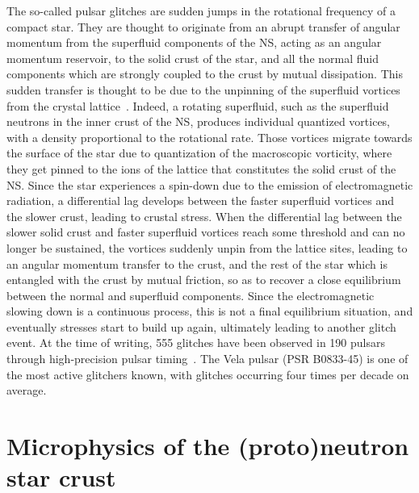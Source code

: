 The so-called pulsar glitches are sudden jumps in the rotational frequency of 
a compact star. They are thought to originate from an abrupt transfer of 
angular momentum from the superfluid components of the NS, acting as an angular 
momentum reservoir, to the solid crust of the star, and all the normal fluid
components which are strongly coupled to the crust by mutual dissipation. This
sudden transfer is thought to be due to the unpinning of the superfluid 
vortices from the crystal lattice~\cite{Anderson1975}. 
%
Indeed, a rotating superfluid, such as the superfluid neutrons in the inner 
crust of the NS, produces individual quantized vortices, with a density 
proportional to the rotational rate. Those vortices migrate towards the surface 
of the star due to {quantization of the macroscopic vorticity}, where 
they get pinned to the ions of the lattice that constitutes the solid 
crust of the NS. Since the star experiences a spin-down due to the emission of 
electromagnetic radiation, a differential lag develops between the faster 
superfluid vortices and the slower crust, leading to crustal stress. 
%
When the differential lag between the slower solid crust and faster superfluid 
vortices reach some threshold and can no longer be sustained, the vortices
suddenly unpin from the lattice sites, leading to an angular momentum transfer
to the crust, and the rest of the star which is entangled with the crust by
mutual friction, so as to recover a close equilibrium between the normal and
superfluid components. Since the electromagnetic slowing down is a continuous
process, this is not a final equilibrium situation, and eventually stresses 
start to build up again, ultimately leading to another glitch event.
%
At the time of writing, 555 glitches have been observed in 190 pulsars through 
high-precision pulsar timing~\cite{Espinoza2011,Glitches}. The Vela pulsar 
(PSR B0833-45) is one of the most active glitchers known, with glitches 
occurring four times per decade on average.

\section*{Microphysics of the (proto)neutron star crust}

